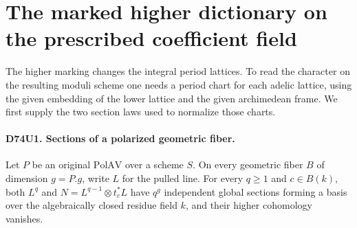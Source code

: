 \section{The marked higher dictionary on the prescribed coefficient field}
\label{sec:prescribed-higher-dictionary}

The higher marking changes the integral period lattices. To read the
character on the resulting moduli scheme one needs a period chart
for each adelic lattice, using the given embedding of the lower
lattice and the given archimedean frame. We first supply the two
section laws used to normalize those charts.

\paragraph{D74U1. Sections of a polarized geometric fiber.}
\label{claim:D74U1}
Let $P$ be an original $\mathrm{PolAV}$ over a scheme $S$. On every
geometric fiber $B$ of dimension $g=P.g$, write $L$ for the pulled
line. For every $q\geq1$ and $c\in B(k)$, both $L^q$ and
$N=L^{q-1}\otimes t_c^*L$ have $q^g$ independent global sections
forming a basis over the algebraically closed residue field $k$, and
their higher cohomology vanishes.

